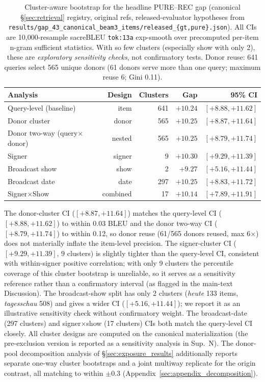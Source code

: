 \documentclass[pdflatex,sn-chicago]{sn-jnl}
\begin{document}
\begin{table}[h]
\centering
\scriptsize
\caption{Cluster-aware bootstrap for the headline PURE--REC gap (canonical \S\ref{sec:retrieval} registry, original refs, released-evaluator hypotheses from \texttt{results/gap\_43\_canonical\_beam3\_items/released\_\{gt,pure\}.json}). All CIs are 10{,}000-resample sacreBLEU \texttt{tok:13a} exp-smooth over precomputed per-item n-gram sufficient statistics. With so few clusters (especially show with only 2), these are \emph{exploratory sensitivity checks}, not confirmatory tests. Donor reuse: 641 queries select 565 unique donors (61 donors serve more than one query; maximum reuse 6; Gini 0.11).}
\label{tab:cluster_bootstrap}
\begin{tabular}{lrrrr}
\toprule
Analysis & Design & Clusters & Gap & 95\% CI \\
\midrule
Query-level (baseline)       & item            & 641 & $+10.24$ & $[+8.88, +11.62]$ \\
Donor cluster                & donor           & 565 & $+10.25$ & $[+8.87, +11.64]$ \\
Donor two-way (query$\times$donor) & nested    & 565 & $+10.25$ & $[+8.79, +11.74]$ \\
Signer                       & signer          & 9   & $+10.30$ & $[+9.29, +11.39]$ \\
Broadcast show               & show            & 2   & $+9.27$  & $[+5.16, +11.44]$ \\
Broadcast date               & date            & 297 & $+10.25$ & $[+8.83, +11.72]$ \\
Signer$\times$Show           & combined        & 17  & $+10.14$ & $[+7.89, +11.91]$ \\
\bottomrule
\end{tabular}
\end{table}

The donor-cluster CI ($[+8.87,+11.64]$) matches the query-level CI ($[+8.88,+11.62]$) to within 0.03 BLEU and the donor two-way CI ($[+8.79,+11.74]$) to within 0.12, so donor reuse (61/565 donors reused, max 6$\times$) does not materially inflate the item-level precision. The signer-cluster CI ($[+9.29,+11.39]$, 9 clusters) is slightly tighter than the query-level CI, consistent with within-signer positive correlation; with only 9 clusters the percentile coverage of this cluster bootstrap is unreliable, so it serves as a sensitivity reference rather than a confirmatory interval (as flagged in the main-text Discussion). The broadcast-show split has only 2 clusters (\emph{heute} 133 items, \emph{tagesschau} 508) and gives a wider CI ($[+5.16,+11.44]$); we report it as an illustrative sensitivity check without confirmatory weight. The broadcast-date (297 clusters) and signer$\times$show (17 clusters) CIs both match the query-level CI closely. All cluster designs are computed on the canonical materialization (the pre-exclusion version is reported as a sensitivity analysis in Sup.~N). The donor-pool decomposition analysis of \S\ref{sec:exposure_results} additionally reports separate one-way cluster bootstraps and a joint multiway replicate for the origin contrast, all matching to within $\pm 0.3$ (Appendix~\ref{sec:appendix_decomposition}).
\end{document}
